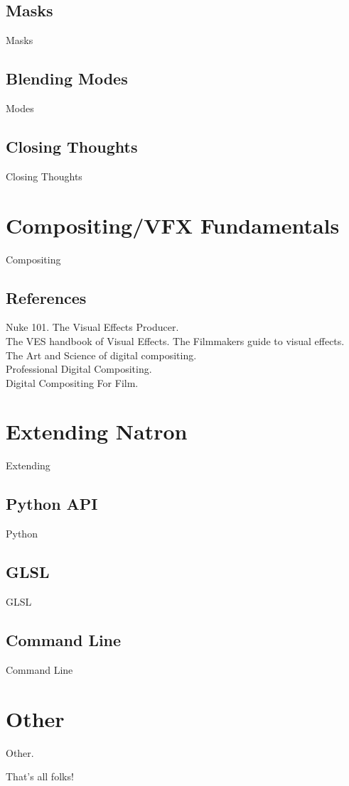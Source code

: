 \documentclass[12pt,oneside,openany,letterpaper]{memoir}
\begin{document}
\chapter{Masks}
Masks







\chapter{Blending Modes}
Modes







\chapter{Closing Thoughts}
Closing Thoughts


\part{Compositing/VFX Fundamentals}

Compositing

\chapter{References}
Nuke 101. The Visual Effects Producer. \\
The VES handbook of Visual Effects. The Filmmakers guide to visual effects. \\
The Art and Science of digital compositing. \\
Professional Digital Compositing. \\
Digital Compositing For Film.


\part{ Extending Natron}
Extending

\chapter{Python API}
Python

\chapter{GLSL}
GLSL

\chapter{Command Line}
Command Line



\part{Other}
Other.




That's all folks!
\end{document}
